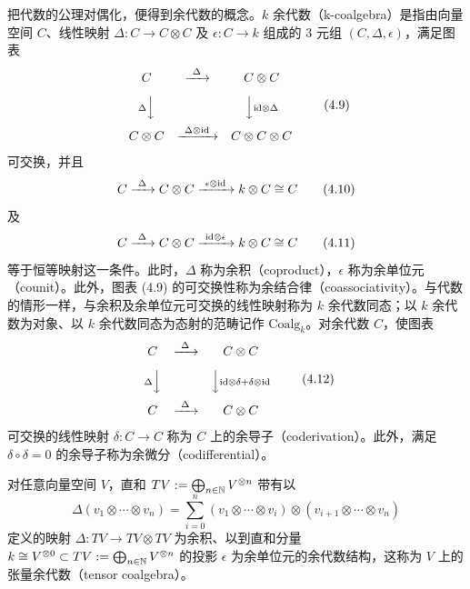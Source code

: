 把代数的公理对偶化，便得到余代数的概念。$k$ 余代数（k-coalgebra）是指由向量空间 $C$、线性映射 $\Delta\colon C\to C\otimes C$ 及 $\epsilon\colon C\to k$ 组成的 3 元组 $(C,\Delta,\epsilon)$，满足图表
\begin{equation}
  \begin{array}{ccc}
    C & \xrightarrow{\ \Delta\ } & C\otimes C\\[8pt]
    {\scriptstyle\Delta}\Big\downarrow & & \Big\downarrow{\scriptstyle\mathrm{id}\otimes\Delta}\\[8pt]
    C\otimes C & \xrightarrow{\ \Delta\otimes\mathrm{id}\ } & C\otimes C\otimes C
  \end{array} \tag{4.9}
\end{equation}
可交换，并且
\begin{equation}
  C \xrightarrow{\ \Delta\ } C\otimes C \xrightarrow{\ \epsilon\otimes\mathrm{id}\ } k\otimes C \cong C \tag{4.10}
\end{equation}
及
\begin{equation}
  C \xrightarrow{\ \Delta\ } C\otimes C \xrightarrow{\ \id\otimes\epsilon\ } k\otimes C \cong C \tag{4.11}
\end{equation}
等于恒等映射这一条件。此时，$\Delta$ 称为余积（coproduct），$\epsilon$ 称为余单位元（counit）。此外，图表 (4.9) 的可交换性称为余结合律（coassociativity）。与代数的情形一样，与余积及余单位元可交换的线性映射称为 $k$ 余代数同态；以 $k$ 余代数为对象、以 $k$ 余代数同态为态射的范畴记作 $\mathrm{Coalg}_k$。对余代数 $C$，使图表
\begin{equation}
  \begin{array}{ccc}
    C & \xrightarrow{\ \Delta\ } & C\otimes C\\[8pt]
    {\scriptstyle\Delta}\Big\downarrow & & \Big\downarrow{\scriptstyle\mathrm{id}\otimes\delta+\delta\otimes\mathrm{id}}\\[8pt]
    C & \xrightarrow{\ \Delta\ } & C\otimes C
  \end{array} \tag{4.12}
\end{equation}
可交换的线性映射 $\delta\colon C\to C$ 称为 $C$ 上的余导子（coderivation）。此外，满足 $\delta\circ\delta=0$ 的余导子称为余微分（codifferential）。


对任意向量空间 $V$，直和 $TV:=\bigoplus_{n\in\mathbb{N}}V^{\otimes n}$ 带有以
\begin{equation}
  \Delta(v_1\otimes\cdots\otimes v_n) = \sum_{i=0}^{n}(v_1\otimes\cdots\otimes v_i)\otimes(v_{i+1}\otimes\cdots\otimes v_n) \tag{4.13}
\end{equation}
定义的映射 $\Delta\colon TV\to TV\otimes TV$ 为余积、以到直和分量 $k\cong V^{\otimes 0}\subset TV:=\bigoplus_{n\in\mathbb{N}}V^{\otimes n}$ 的投影 $\epsilon$ 为余单位元的余代数结构，这称为 $V$ 上的张量余代数（tensor coalgebra）。

